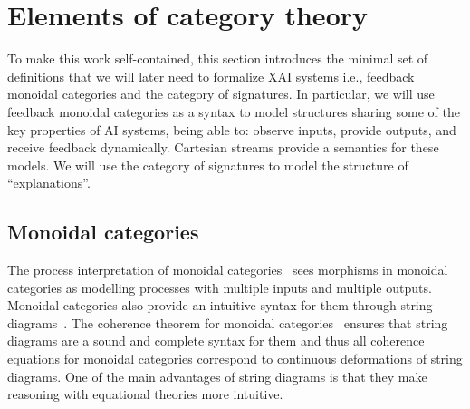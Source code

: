 


\section{Elements of category theory}
\label{sec:pre}
To make this work self-contained, this section introduces the minimal set of definitions that we will later need to formalize XAI systems i.e., feedback monoidal categories and the category of signatures. In particular, we will use feedback monoidal categories as a syntax to model structures sharing some of the key properties of AI systems, being able to: observe inputs, provide outputs, and receive feedback dynamically. Cartesian streams provide a semantics for these models. We will use the category of signatures to model the structure of ``explanations''.

\subsection{Monoidal categories}
The process interpretation of monoidal categories~\cite{Coecke2017,fritz2020} sees morphisms in monoidal categories as modelling processes with multiple inputs and multiple outputs.
Monoidal categories also provide an intuitive syntax for them through string diagrams~\cite{joyal1991geometry}.
The coherence theorem for monoidal categories~\cite{maclane78} ensures that string diagrams are a sound and complete syntax for them and thus all coherence equations for monoidal categories correspond to continuous deformations of string diagrams. One of the main advantages of string diagrams is that they make reasoning with equational theories more intuitive.

